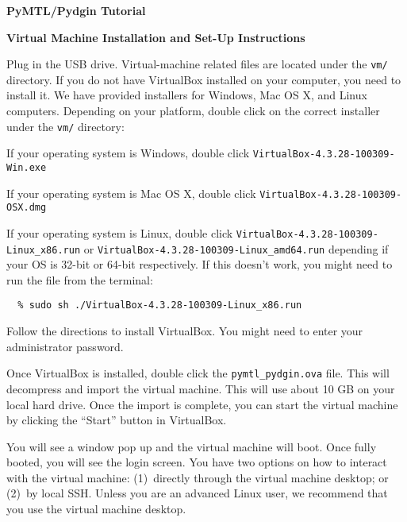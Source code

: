 \documentclass[11pt]{article}
\newenvironment{cbxlist}
{%
  \begin{list}{\textbullet}
  {%
    \setlength{\leftmargin}{1.5em}
    \setlength{\rightmargin}{0em}
    \setlength{\topsep}{0.05in}
    \setlength{\parsep}{0pt}
    \setlength{\listparindent}{0pt}
    \setlength{\itemsep}{0.5em}
  }
}{%
  \end{list}
}
\begin{document}
\pagestyle{empty}

\begin{center}

  {\LARGE\textbf{PyMTL/Pydgin Tutorial}}

  \vspace{0.05in}
  {\LARGE\textbf{Virtual Machine Installation and Set-Up Instructions}}

\end{center}

\vspace{0.1in}
Plug in the USB drive. Virtual-machine related files are located under the
\texttt{vm/} directory. If you do not have VirtualBox installed on your
computer, you need to install it. We have provided installers for Windows,
Mac OS X, and Linux computers. Depending on your platform, double click on
the correct installer under the \texttt{vm/} directory:

\begin{cbxlist}

  \item If your operating system is Windows, double click
  \texttt{VirtualBox-4.3.28-100309-Win.exe}
  \item If your operating system is Mac OS X, double click
  \texttt{VirtualBox-4.3.28-100309-OSX.dmg}
  \item If your operating system is Linux, double click
    \texttt{VirtualBox-4.3.28-100309-Linux\_x86.run} or
    \texttt{VirtualBox-4.3.28-100309-Linux\_amd64.run} depending if your OS is
    32-bit or 64-bit respectively. If this doesn't work, you might need to
    run the file from the terminal:

    \begin{verbatim}
  % sudo sh ./VirtualBox-4.3.28-100309-Linux_x86.run
    \end{verbatim}

\end{cbxlist}
\vspace{-0.15in}

Follow the directions to install VirtualBox. You might need to enter your
administrator password.

Once VirtualBox is installed, double click the \texttt{pymtl\_pydgin.ova}
file. This will decompress and import the virtual machine. This will use
about 10 GB on your local hard drive. Once the import is complete, you
can start the virtual machine by clicking the ``Start'' button in
VirtualBox.

You will see a window pop up and the virtual machine will boot. Once
fully booted, you will see the login screen. You have two options on how
to interact with the virtual machine: (1)~directly through the virtual
machine desktop; or (2)~by local SSH. Unless you are an advanced Linux
user, we recommend that you use the virtual machine desktop.
\end{document}
